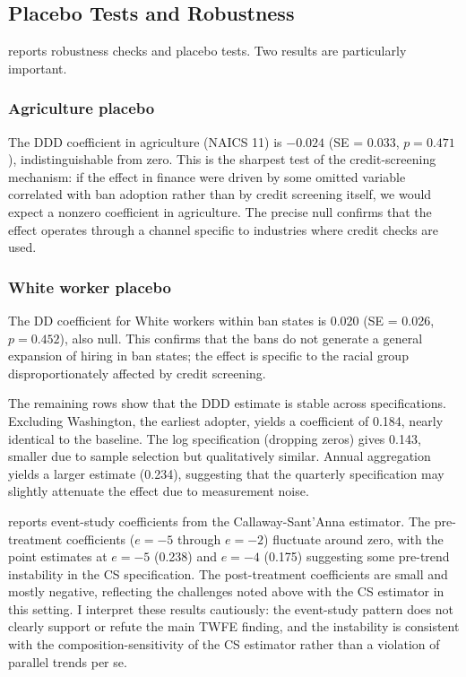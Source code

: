 \documentclass[12pt]{article}
\begin{document}
\subsection{Placebo Tests and Robustness}



 reports robustness checks and placebo tests. Two results are particularly important.

\subsubsection*{Agriculture placebo} The DDD coefficient in agriculture (NAICS 11) is $-0.024$ (SE = 0.033, $p = 0.471$), indistinguishable from zero. This is the sharpest test of the credit-screening mechanism: if the effect in finance were driven by some omitted variable correlated with ban adoption rather than by credit screening itself, we would expect a nonzero coefficient in agriculture. The precise null confirms that the effect operates through a channel specific to industries where credit checks are used.

\subsubsection*{White worker placebo} The DD coefficient for White workers within ban states is 0.020 (SE = 0.026, $p = 0.452$), also null. This confirms that the bans do not generate a general expansion of hiring in ban states; the effect is specific to the racial group disproportionately affected by credit screening.

The remaining rows show that the DDD estimate is stable across specifications. Excluding Washington, the earliest adopter, yields a coefficient of 0.184, nearly identical to the baseline. The log specification (dropping zeros) gives 0.143, smaller due to sample selection but qualitatively similar. Annual aggregation yields a larger estimate (0.234), suggesting that the quarterly specification may slightly attenuate the effect due to measurement noise.



 reports event-study coefficients from the Callaway-Sant'Anna estimator. The pre-treatment coefficients ($e = -5$ through $e = -2$) fluctuate around zero, with the point estimates at $e = -5$ (0.238) and $e = -4$ (0.175) suggesting some pre-trend instability in the CS specification. The post-treatment coefficients are small and mostly negative, reflecting the challenges noted above with the CS estimator in this setting. I interpret these results cautiously: the event-study pattern does not clearly support or refute the main TWFE finding, and the instability is consistent with the composition-sensitivity of the CS estimator rather than a violation of parallel trends per se.
\end{document}
